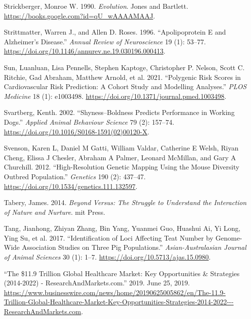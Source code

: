 \documentclass[
]{book}
\newlength{\cslhangindent}
\newlength{\cslentryspacingunit} %
\newenvironment{CSLReferences}[2] %
 {%
  \setlength{\parindent}{0pt}
  \ifodd #1
  \let\oldpar\par
  \def\par{\hangindent=\cslhangindent\oldpar}
  \fi
  \setlength{\parskip}{#2\cslentryspacingunit}
 }%
 {}
\begin{document}
\begin{CSLReferences}{1}{0}
\leavevmode{}%
Strickberger, Monroe W. 1990. \emph{Evolution}. {Jones and Bartlett}. \url{https://books.google.com?id=qU_wAAAAMAAJ}.

\leavevmode{}%
Strittmatter, Warren J., and Allen D. Roses. 1996. {``Apolipoprotein {E} and {Alzheimer}'s {Disease}.''} \emph{Annual Review of Neuroscience} 19 (1): 53--77. \url{https://doi.org/10.1146/annurev.ne.19.030196.000413}.

\leavevmode{}%
Sun, Luanluan, Lisa Pennells, Stephen Kaptoge, Christopher P. Nelson, Scott C. Ritchie, Gad Abraham, Matthew Arnold, et al. 2021. {``Polygenic Risk Scores in Cardiovascular Risk Prediction: {A} Cohort Study and Modelling Analyses.''} \emph{PLOS Medicine} 18 (1): e1003498. \url{https://doi.org/10.1371/journal.pmed.1003498}.

\leavevmode{}%
Svartberg, Kenth. 2002. {``Shyness--Boldness Predicts Performance in Working Dogs.''} \emph{Applied Animal Behaviour Science} 79 (2): 157--74. \url{https://doi.org/10.1016/S0168-1591(02)00120-X}.

\leavevmode{}%
Svenson, Karen L, Daniel M Gatti, William Valdar, Catherine E Welsh, Riyan Cheng, Elissa J Chesler, Abraham A Palmer, Leonard McMillan, and Gary A Churchill. 2012. {``High-{Resolution Genetic Mapping Using} the {Mouse Diversity Outbred Population}.''} \emph{Genetics} 190 (2): 437--47. \url{https://doi.org/10.1534/genetics.111.132597}.

\leavevmode{}%
Tabery, James. 2014. \emph{Beyond Versus: {The} Struggle to Understand the Interaction of Nature and Nurture}. {mit Press}.

\leavevmode{}%
Tang, Jianhong, Zhiyan Zhang, Bin Yang, Yuanmei Guo, Huashui Ai, Yi Long, Ying Su, et al. 2017. {``Identification of Loci Affecting Teat Number by Genome-Wide Association Studies on Three Pig Populations.''} \emph{Asian-Australasian Journal of Animal Sciences} 30 (1): 1--7. \url{https://doi.org/10.5713/ajas.15.0980}.

\leavevmode{}%
{``The \$11.9 {Trillion Global Healthcare Market}: {Key Opportunities} \& {Strategies} (2014-2022) - {ResearchAndMarkets}.com.''} 2019. June 25, 2019. \url{https://www.businesswire.com/news/home/20190625005862/en/The-11.9-Trillion-Global-Healthcare-Market-Key-Opportunities-Strategies-2014-2022---ResearchAndMarkets.com}.


\end{CSLReferences}
\end{document}
